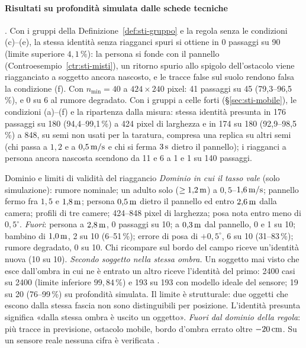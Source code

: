 \paragraph{Risultati su profondità simulata dalle schede tecniche} . Con i gruppi della Definizione~\ref{def:sti-gruppo} e la regola senza le condizioni (c)--(e), la stessa identità senza riagganci spuri si ottiene in 0 passaggi su 90 (limite superiore $4{,}1\,\%$): la persona si fonde con il pannello (Controesempio~\ref{ctr:sti-misti}), un ritorno spurio allo spigolo dell'ostacolo viene riagganciato a soggetto ancora nascosto, e le tracce false sul suolo rendono falsa la condizione (f). Con $n_{\min}=40$ a $424\times240$ pixel: 41 passaggi su 45 (79,3--96,5\,\%), e 0 su 6 al rumore degradato. Con i gruppi a celle forti (\S\ref{sec:sti-mobile}), le condizioni (a)--(f) e la ripartenza dalla misura: stessa identità presunta in 176 passaggi su 180 (94,4--99,1\,\%) a 424 pixel di larghezza e in 174 su 180 (92,9--98,5\,\%) a 848, su semi non usati per la taratura, compresa una replica su altri semi (chi passa a $1{,}2$ e a $0{,}5\,\mathrm{m/s}$ e chi si ferma $3\,\mathrm{s}$ dietro il pannello); i riagganci a persona ancora nascosta scendono da 11 e 6 a 1 e 1 su 140 passaggi.

\begin{riquadro}{Dominio e limiti di validità del riaggancio}
\emph{Dominio in cui il tasso vale} (solo simulazione): rumore nominale; un adulto solo ($\ge1{,}2\,\mathrm{m}$) a $0{,}5$--$1{,}6\,\mathrm{m/s}$; pannello fermo fra $1{,}5$ e $1{,}8\,\mathrm{m}$; persona $0{,}5\,\mathrm{m}$ dietro il pannello ed entro $2{,}6\,\mathrm{m}$ dalla camera; profili di tre camere; 424--848 pixel di larghezza; posa nota entro meno di $0{,}5^\circ$.
\emph{Fuori}: persona a $2{,}8\,\mathrm{m}$, 0 passaggi su 10; a $0{,}3\,\mathrm{m}$ dal pannello, 0 e 1 su 10; bambino di $1{,}0\,\mathrm{m}$, 2 su 10 (6--51\,\%); errore di posa di $+0{,}5^\circ$, 6 su 10 (31--83\,\%); rumore degradato, 0 su 10. Chi ricompare sul bordo del campo riceve un'identità nuova (10 su 10).
\emph{Secondo soggetto nella stessa ombra.} Un soggetto mai visto che esce dall'ombra in cui ne è entrato un altro riceve l'identità del primo: 2400 casi su 2400 (limite inferiore $99{,}84\,\%$) e 193 su 193 con modello ideale del sensore; 19 su 20 (76--99\,\%) su profondità simulata. Il limite è strutturale: due oggetti che escono dalla stessa fascia non sono distinguibili per posizione. L'identità presunta significa «dalla stessa ombra è uscito un oggetto».
\emph{Fuori dal dominio della regola}: più tracce in previsione, ostacolo mobile, bordo d'ombra errato oltre $-20\,\mathrm{cm}$. Su un sensore reale nessuna cifra è verificata .
\end{riquadro}
